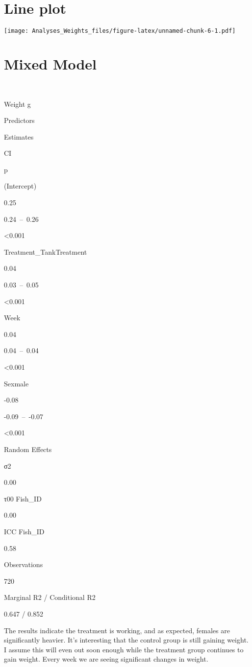 \documentclass[]{article}
\begin{document}
\section{Line plot}\label{line-plot}

\texttt{[image: Analyses\_Weights\_files/figure-latex/unnamed-chunk-6-1.pdf]}

\section{Mixed Model}\label{mixed-model}

~

Weight g

Predictors

Estimates

CI

p

(Intercept)

0.25

0.24~--~0.26

\textless{}0.001

Treatment\_TankTreatment

0.04

0.03~--~0.05

\textless{}0.001

Week

0.04

0.04~--~0.04

\textless{}0.001

Sexmale

-0.08

-0.09~--~-0.07

\textless{}0.001

Random Effects

σ2

0.00

τ00 Fish\_ID

0.00

ICC Fish\_ID

0.58

Observations

720

Marginal R2 / Conditional R2

0.647 / 0.852

The results indicate the treatment is working, and as expected, females
are significantly heavier. It's interesting that the control group is
still gaining weight. I assume this will even out soon enough while the
treatment group continues to gain weight. Every week we are seeing
significant changes in weight.
\end{document}
